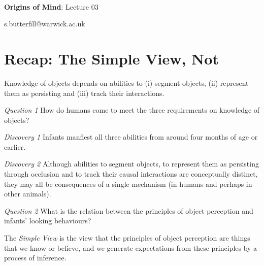 \documentclass[12pt]{extarticle}
\date{}
\makeatletter
\def \ititle {Origins of Mind}
\def \isubtitle {Lecture 02}
\def \iemail{s.butterfill@warwick.ac.uk}
\makeatother
\begin{document}
\begin{multicols}{3}

\setlength\footnotesep{1em}










\def \ititle {Origins of Mind}
 
\def \isubtitle {Lecture 03}
 
 
 
\
 
 
 
\begin{center}
 
{\Large
 
\textbf{\ititle}: \isubtitle
 
}
 
 
 
\iemail %
 
\end{center}
 
 
 
\section{Recap: The Simple View, Not}
 
Knowledge of objects depends on abilities to (i) segment objects, (ii) represent them as 
persisting and (iii) track their interactions.
 
\emph{Question 1}  How do humans come to meet the three requirements on knowledge of objects?
 
\emph{Discovery 1} Infants manfiest all three abilities from around four months of age or 
earlier.
 
\emph{Discovery 2} Although abilities to segment objects, to represent them as persisting 
through occlusion and  to track their causal interactions are conceptually distinct, they 
may all be consequences of a single mechanism (in humans and perhaps in other animals).
 
\emph{Question 2} What is the relation between the principles of object perception and infants’ looking behaviours?
 
The \emph{Simple View} is the view that the principles of object perception are things that we know or believe, and we generate expectations from these principles by a process of inference.
 

\end{multicols}
\end{document}
